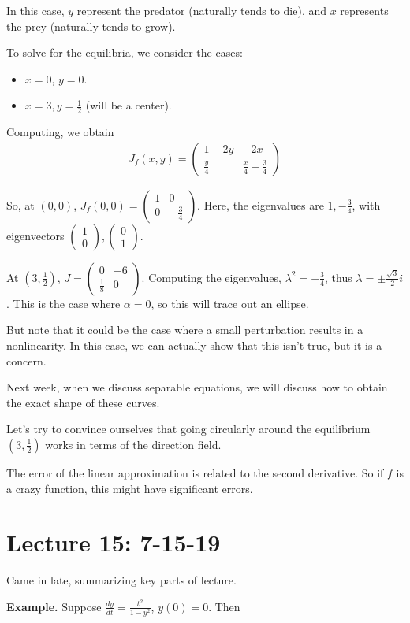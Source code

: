\documentclass{article}
\newcommand{\mat}[1]{\begin{pmatrix}#1\end{pmatrix}}
\begin{document}
In this case, $y$ represent the predator (naturally tends to die), and $x$ represents the prey (naturally tends to grow).

To solve for the equilibria, we consider the cases:

\begin{itemize}
  \item $x = 0$, $y= 0$.
  \item $x = 3, y = \frac{1}{2}$ (will be a center).
\end{itemize}

Computing, we obtain
\begin{align*}
  J_f(x, y) = \mat{1 - 2y & -2x \\ \frac{y}{4} & \frac{x}{4} - \frac{3}{4}}
\end{align*}

So, at $(0, 0)$, $J_f(0, 0) = \mat{1 & 0 \\ 0 & - \frac{3}{4}}$.  Here, the eigenvalues are $1, -\frac{3}{4}$, with eigenvectors $\mat{1 \\ 0}, \mat{0 \\ 1}$.

At $(3, \frac{1}{2})$, $J = \mat{0 & -6 \\ \frac{1}{8} & 0}$.  Computing the eigenvalues, $\lambda^2 = - \frac{3}{4}$, thus $\lambda = \pm \frac{\sqrt{3}}{2} i$.  This is the case where $\alpha = 0$, so this will trace out an ellipse.

But note that it could be the case where a small perturbation results in a nonlinearity.  In this case, we can actually show that this isn't true, but it is a concern.

Next week, when we discuss separable equations, we will discuss how to obtain the exact shape of these curves.

Let's try to convince ourselves that going circularly around the equilibrium $(3, \frac{1}{2})$ works in terms of the direction field.

The error of the linear approximation is related to the second derivative.  So if $f$ is a crazy function, this might have significant errors.

\section{Lecture 15: 7-15-19}

Came in late, summarizing key parts of lecture.

{\bf Example.} Suppose $\frac{dy}{dt} = \frac{t^2}{1 - y^2}$, $y(0) = 0$.  Then
\end{document}

